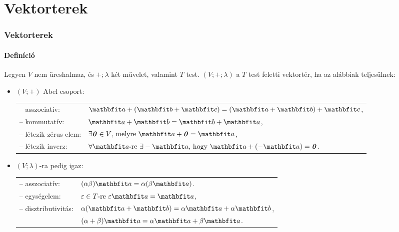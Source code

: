 \section{Vektorterek}
\begin{frame}
  \frametitle{Vektorterek}
  \framesubtitle{Definíció}

  \justifying
  Legyen $V$ nem üreshalmaz, és $+; \lambda$ két művelet, valamint $T$ test.
  $(V; +; \lambda)$ a $T$ test feletti vektortér, ha az alábbiak teljesülnek:
  \begin{itemize}
    \def\arraystretch{1.2}
    \item $(V; +)$ Abel csoport:\\[1mm]
          \begin{tabular}{p{35mm} l}
            -- asszociatív:        &
            $\rvec a + (\rvec b + \rvec c) = (\rvec a + \rvec b) + \rvec c$,
            \\
            -- kommutatív:         &
            $\rvec a + \rvec b = \rvec b + \rvec a$,
            \\
            -- létezik zérus elem: &
            $\exists \nvec \in V \text{, melyre } \rvec a + \nvec = \rvec a$,
            \\
            -- létezik inverz:     &
            $\forall \rvec a \text{-re } \exists - \rvec a \text{, hogy } \rvec a + (- \rvec a) = \nvec$.
          \end{tabular}
    \item $(V; \lambda)$-ra pedig igaz:\\[1mm]
          \begin{tabular}{p{35mm} l}
            -- asszociatív:      & $(\alpha \beta) \rvec a = \alpha (\beta \rvec a)$.
            \\
            -- egységelem:       & $\varepsilon \in T \text{-re } \varepsilon\rvec a = \rvec a$,
            \\
            -- disztributivitás: & $\alpha(\rvec a + \rvec b) = \alpha \rvec a + \alpha \rvec b$,
            \\
                                 & $(\alpha + \beta) \rvec a = \alpha \rvec a + \beta \rvec a$.
          \end{tabular}
  \end{itemize}
\end{frame}


